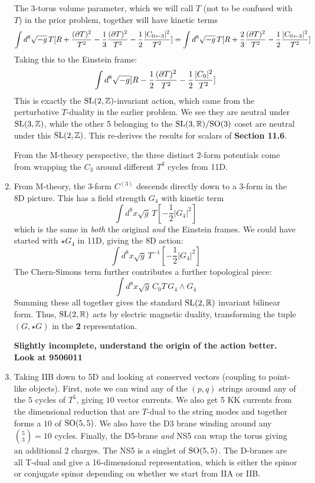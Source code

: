 \documentclass[11pt, class=article, crop=false]{standalone}
\begin{document}
\begin{enumerate}
	The 3-torus volume parameter, which we will call $T$ (not to be confused with $T$) in the prior problem, together will have kinetic terms
	\[
		\int d^8 \sqrt{-g}\, T [R + \frac{(\partial T)^2}{T^2} - \frac13 \frac{(\partial T)^2}{T^2} - \frac12 \frac{|C_{0 \leftarrow 3}|^2}{T^2}] = \int d^8 \sqrt{-g}\, T [R + \frac23 \frac{(\partial T)^2}{T^2} - \frac12 \frac{|C_{0 \leftarrow 3}|^2}{T^2}]
	\]
	Taking this to the Einstein frame:
	\[
		\int d^8 \sqrt{-g} [R - \frac12 \frac{(\partial T)^2}{T^2} - \frac12 \frac{|C_0|^2}{T^2}]
	\]
	This is exactly the $\mathrm{SL}(2, \mathbb{Z})$-invariant action, which came from the perturbative $T$-duality in the earlier problem. We see they are neutral under $\mathrm{SL}(3, \mathbb{Z})$, while the other 5 belonging to the $\mathrm{SL}(3, \mathbb{R})/\mathrm{SO}(3)$ coset are neutral under this $\mathrm{SL}(2, \mathbb{Z})$. This re-derives the results for scalars of \textbf{Section 11.6}.
	
	From the M-theory perspective, the three distinct 2-form potentials come from wrapping the $C_3$ around different $T^3$ cycles from 11D. 
	
	\item From M-theory, the $3$-form $C^{(3)}$ descends directly down to a 3-form in the 8D picture. This has a field strength $G_4$ with kinetic term
	\[
		\int d^8 x \sqrt{g} \, T \left[- \frac12 |G_4|^2 \right] 
	\]
	which is the same in \emph{both} the original \emph{and} the Einstein frames. We could have started with $\star G_4$ in 11D, giving the 8D action:
	\[
		\int d^8 x \sqrt{g} \, T^{-1} \left[- \frac12 |G_4|^2 \right] 
	\]
	The Chern-Simons term further contributes a further topological piece:
	\[
		 \int d^8 x \sqrt{g}\, C_0 T \, G_4 \wedge G_4
	\]
	Summing these all together gives the standard $\mathrm{SL}(2, \mathbb{R})$ invariant bilinear form.  Thus, $\mathrm{SL}(2,\mathbb{R})$ acts by electric magnetic duality, transforming the tuple $(G, \star G)$ in the \textbf{2} representation. 
	
	\textbf{Slightly incomplete, understand the origin of the action better. Look at 9506011}
	
	\item Taking IIB down to 5D and looking at conserved vectors (coupling to point-like objects). First, note we can wind any of the $(p,q)$ strings around any of the $5$ cycles of $T^5$, giving $10$ vector currents. We also get 5 KK currents from the dimensional reduction that are $T$-dual to the string modes and together forms a $10$ of $\mathrm{SO}(5,5)$. We also have the D3 brane winding around any ${5 \choose 3} = 10$ cycles. Finally, the D5-brane \emph{and} NS5 can wrap the torus giving an additional $2$ charges. The NS5 is a singlet of $\mathrm{SO}(5,5)$. The D-branes are all T-dual and give a 16-dimensional representation, which is either the spinor or conjugate spinor depending on whether we start from IIA or IIB. 
	

\end{enumerate}
\end{document}
